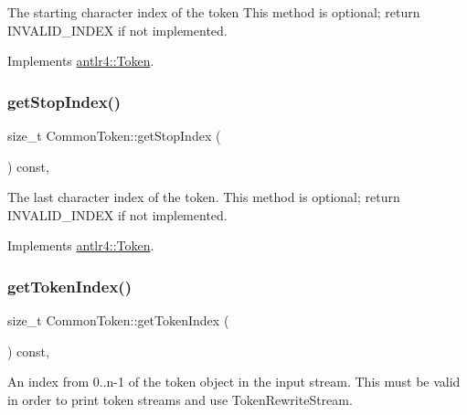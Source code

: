 The starting character index of the token This method is optional; return I\+N\+V\+A\+L\+I\+D\+\_\+\+I\+N\+D\+EX if not implemented. 

Implements \hyperlink{classantlr4_1_1Token_ab0baee45182ad985ba4a61e4a46ffe6a}{antlr4\+::\+Token}.

\mbox{\label{classantlr4_1_1CommonToken_ad896be62187eb93d6f0e0e7930d7a500}} 
\subsubsection{\texorpdfstring{get\+Stop\+Index()}{getStopIndex()}}
{\footnotesize\ttfamily size\+\_\+t Common\+Token\+::get\+Stop\+Index (\begin{DoxyParamCaption}{ }\end{DoxyParamCaption}) const\hspace{0.3cm}{\ttfamily [override]}, {\ttfamily [virtual]}}

The last character index of the token. This method is optional; return I\+N\+V\+A\+L\+I\+D\+\_\+\+I\+N\+D\+EX if not implemented. 

Implements \hyperlink{classantlr4_1_1Token_a813d966d66613c76f6af1e843a4b3359}{antlr4\+::\+Token}.

\mbox{\label{classantlr4_1_1CommonToken_ae94edeb1c320914502ca30a89332c5ef}} 
\subsubsection{\texorpdfstring{get\+Token\+Index()}{getTokenIndex()}}
{\footnotesize\ttfamily size\+\_\+t Common\+Token\+::get\+Token\+Index (\begin{DoxyParamCaption}{ }\end{DoxyParamCaption}) const\hspace{0.3cm}{\ttfamily [override]}, {\ttfamily [virtual]}}

An index from 0..n-\/1 of the token object in the input stream. This must be valid in order to print token streams and use Token\+Rewrite\+Stream.

